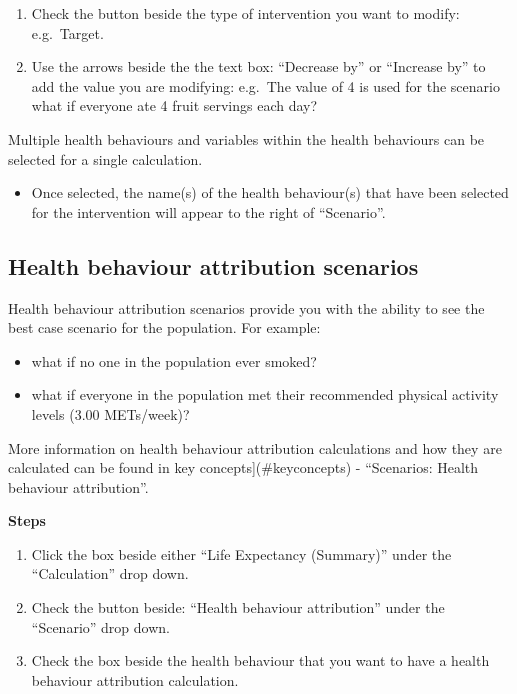\documentclass[]{book}
\providecommand{\tightlist}{%
  \setlength{\itemsep}{0pt}\setlength{\parskip}{0pt}}
\begin{document}
\begin{enumerate}
\def\labelenumi{\arabic{enumi}.}
\setcounter{enumi}{4}
\item
  Check the button beside the type of intervention you want to modify:
  e.g.~Target.
\item
  Use the arrows beside the the text box: ``Decrease by'' or ``Increase
  by'' to add the value you are modifying: e.g.~The value of 4 is used
  for the scenario what if everyone ate 4 fruit servings each day?
\end{enumerate}

Multiple health behaviours and variables within the health behaviours
can be selected for a single calculation.

\begin{itemize}
\tightlist
\item
  Once selected, the name(s) of the health behaviour(s) that have been
  selected for the intervention will appear to the right of
  ``Scenario''.
\end{itemize}

\subsection{Health behaviour attribution
scenarios}\label{health-behaviour-attribution-scenarios}

Health behaviour attribution scenarios provide you with the ability to
see the best case scenario for the population. For example:

\begin{itemize}
\tightlist
\item
  what if no one in the population ever smoked?
\item
  what if everyone in the population met their recommended physical
  activity levels (3.00 METs/week)?
\end{itemize}

More information on health behaviour attribution calculations and how
they are calculated can be found in key concepts{]}(\#keyconcepts) -
``Scenarios: Health behaviour attribution''.

\textbf{Steps}

\begin{enumerate}
\def\labelenumi{\arabic{enumi}.}
\item
  Click the box beside either ``Life Expectancy (Summary)'' under the
  ``Calculation'' drop down.
\item
  Check the button beside: ``Health behaviour attribution'' under the
  ``Scenario'' drop down.
\item
  Check the box beside the health behaviour that you want to have a
  health behaviour attribution calculation.
\end{enumerate}
\end{document}
